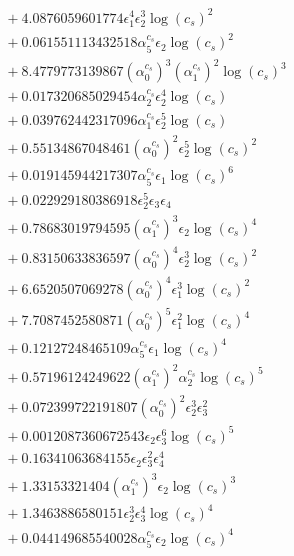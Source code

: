 \documentclass[10pt]{article}
\begin{document}
\begin{align*}
&{}  + 4.0876059601774 \epsilon_{1}^{4} \epsilon_{2}^{3} \log{\left(c_{s} \right)}^{2} \\
&{}  + 0.061551113432518 \alpha_{5}^{c_s} \epsilon_{2} \log{\left(c_{s} \right)}^{2} \\
&{}  + 8.4779773139867 \left(\alpha_{0}^{c_s}\right)^{3} \left(\alpha_{1}^{c_s}\right)^{2} \log{\left(c_{s} \right)}^{3} \\
&{}  + 0.017320685029454 \alpha_{2}^{c_s} \epsilon_{2}^{4} \log{\left(c_{s} \right)} \\
&{}  + 0.039762442317096 \alpha_{1}^{c_s} \epsilon_{2}^{5} \log{\left(c_{s} \right)} \\
&{}  + 0.55134867048461 \left(\alpha_{0}^{c_s}\right)^{2} \epsilon_{2}^{5} \log{\left(c_{s} \right)}^{2} \\
&{}  + 0.019145944217307 \alpha_{5}^{c_s} \epsilon_{1} \log{\left(c_{s} \right)}^{6} \\
&{}  + 0.022929180386918 \epsilon_{2}^{5} \epsilon_{3} \epsilon_{4} \\
&{}  + 0.78683019794595 \left(\alpha_{1}^{c_s}\right)^{3} \epsilon_{2} \log{\left(c_{s} \right)}^{4} \\
&{}  + 0.83150633836597 \left(\alpha_{0}^{c_s}\right)^{4} \epsilon_{2}^{3} \log{\left(c_{s} \right)}^{2} \\
&{}  + 6.6520507069278 \left(\alpha_{0}^{c_s}\right)^{4} \epsilon_{1}^{3} \log{\left(c_{s} \right)}^{2} \\
&{}  + 7.7087452580871 \left(\alpha_{0}^{c_s}\right)^{5} \epsilon_{1}^{2} \log{\left(c_{s} \right)}^{4} \\
&{}  + 0.12127248465109 \alpha_{5}^{c_s} \epsilon_{1} \log{\left(c_{s} \right)}^{4} \\
&{}  + 0.57196124249622 \left(\alpha_{1}^{c_s}\right)^{2} \alpha_{2}^{c_s} \log{\left(c_{s} \right)}^{5} \\
&{}  + 0.072399722191807 \left(\alpha_{0}^{c_s}\right)^{2} \epsilon_{2}^{3} \epsilon_{3}^{2} \\
&{}  + 0.0012087360672543 \epsilon_{2} \epsilon_{3}^{6} \log{\left(c_{s} \right)}^{5} \\
&{}  + 0.16341063684155 \epsilon_{2} \epsilon_{3}^{2} \epsilon_{4}^{4} \\
&{}  + 1.33153321404 \left(\alpha_{1}^{c_s}\right)^{3} \epsilon_{2} \log{\left(c_{s} \right)}^{3} \\
&{}  + 1.3463886580151 \epsilon_{2}^{3} \epsilon_{3}^{4} \log{\left(c_{s} \right)}^{4} \\
&{}  + 0.044149685540028 \alpha_{5}^{c_s} \epsilon_{2} \log{\left(c_{s} \right)}^{4} \\

\end{align*}
\end{document}
